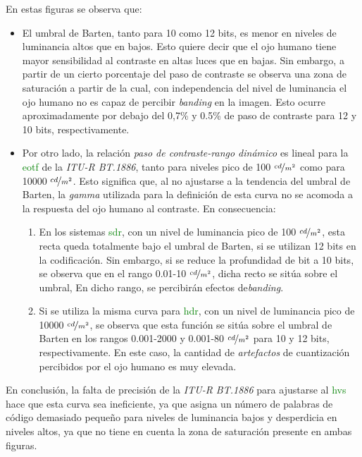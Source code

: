 \documentclass[a4paper, 12pt]{report}
\begin{document}
En estas figuras se observa que:
\begin{itemize}
    \item El umbral de Barten, tanto para 10 como 12 bits, es menor en niveles de luminancia altos que en bajos. Esto quiere decir que el ojo humano tiene mayor sensibilidad al contraste en altas luces que en bajas. Sin embargo, a partir de un cierto porcentaje del paso de contraste se observa una zona de saturación a partir de la cual, con independencia del nivel de luminancia el ojo humano no es capaz de percibir \textit{banding} en la imagen. Esto ocurre aproximadamente por debajo del 0,7\%  y 0.5\% de paso de contraste para 12 y 10 bits, respectivamente.
    
    \item Por otro lado, la relación \textit{paso de contraste-rango dinámico} es lineal para la \textcolor{green}{eotf}  de la \textit{ITU-R BT.1886}, tanto para niveles pico de 100 $\nicefrac{cd}{m^{2}}$ como para 10000 $\nicefrac{cd}{m^{2}}$. Esto significa que, al no ajustarse a la tendencia del umbral de Barten, la \textit{gamma} utilizada para la definición de esta curva no se acomoda a la respuesta del ojo humano al contraste. En consecuencia:
    \begin{enumerate}
        \item En los sistemas \textcolor{green}{sdr}, con un nivel de luminancia pico  de 100 $\nicefrac{cd}{m^{2}}$, esta recta queda totalmente bajo el umbral de Barten, si  se utilizan 12 bits en la codificación. Sin embargo, si se reduce la profundidad de bit a 10 bits, se observa que en el rango 0.01-10 $\nicefrac{cd}{m^{2}}$, dicha recto se sitúa sobre el umbral, En dicho rango, se percibirán efectos de\textit{banding}.
        \item Si se utiliza la misma curva para  \textcolor{green}{hdr}, con un nivel de luminancia pico de 10000 $\nicefrac{cd}{m^{2}}$, se observa que esta función se sitúa sobre el umbral de Barten en los rangos 0.001-2000 y 0.001-80 $\nicefrac{cd}{m^{2}}$ para 10 y 12 bits, respectivamente. En este caso, la cantidad de \textit{artefactos} de cuantización percibidos por el ojo humano es muy elevada.
    \end{enumerate}
\end{itemize}

En conclusión, la falta de precisión de la \textit{ITU-R BT.1886} para ajustarse al \textcolor{green}{hvs} hace que esta curva sea ineficiente, ya que asigna un número de palabras de código demasiado pequeño para niveles de luminancia bajos y desperdicia en niveles altos, ya que no tiene en cuenta la zona de saturación presente en ambas figuras.
\end{document}
